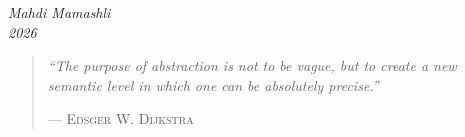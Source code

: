 \vfill

\begin{flushright}
	\textit{Mahdi Mamashli} \\
	\textit{2026} \\
\end{flushright}

\vspace{2em}

\begin{quote}
	\textit{``The purpose of abstraction is not to be vague, but to create a new semantic level in which one can be absolutely precise.''}

	\hfill--- \textsc{Edsger W. Dijkstra}
\end{quote}

\clearpage
